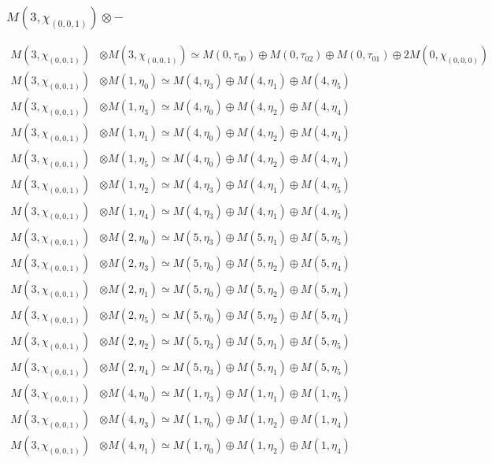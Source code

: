 \subsubsection{$ M(3,\chi_{(0,0,1)})\otimes -$}
\begin{align*}
M(3,\chi_{(0,0,1)}) &\otimes M(3,\chi_{(0,0,1)}) \simeq M(0,\tau_{00}) \oplus M(0,\tau_{02}) \oplus M(0,\tau_{01}) \oplus 2 M(0,\chi_{(0,0,0)})\\
M(3,\chi_{(0,0,1)}) &\otimes M(1,\eta_{0}) \simeq M(4,\eta_{3}) \oplus M(4,\eta_{1}) \oplus M(4,\eta_{5})\\
M(3,\chi_{(0,0,1)}) &\otimes M(1,\eta_{3}) \simeq M(4,\eta_{0}) \oplus M(4,\eta_{2}) \oplus M(4,\eta_{4})\\
M(3,\chi_{(0,0,1)}) &\otimes M(1,\eta_{1}) \simeq M(4,\eta_{0}) \oplus M(4,\eta_{2}) \oplus M(4,\eta_{4})\\
M(3,\chi_{(0,0,1)}) &\otimes M(1,\eta_{5}) \simeq M(4,\eta_{0}) \oplus M(4,\eta_{2}) \oplus M(4,\eta_{4})\\
M(3,\chi_{(0,0,1)}) &\otimes M(1,\eta_{2}) \simeq M(4,\eta_{3}) \oplus M(4,\eta_{1}) \oplus M(4,\eta_{5})\\
M(3,\chi_{(0,0,1)}) &\otimes M(1,\eta_{4}) \simeq M(4,\eta_{3}) \oplus M(4,\eta_{1}) \oplus M(4,\eta_{5})\\
M(3,\chi_{(0,0,1)}) &\otimes M(2,\eta_{0}) \simeq M(5,\eta_{3}) \oplus M(5,\eta_{1}) \oplus M(5,\eta_{5})\\
M(3,\chi_{(0,0,1)}) &\otimes M(2,\eta_{3}) \simeq M(5,\eta_{0}) \oplus M(5,\eta_{2}) \oplus M(5,\eta_{4})\\
M(3,\chi_{(0,0,1)}) &\otimes M(2,\eta_{1}) \simeq M(5,\eta_{0}) \oplus M(5,\eta_{2}) \oplus M(5,\eta_{4})\\
M(3,\chi_{(0,0,1)}) &\otimes M(2,\eta_{5}) \simeq M(5,\eta_{0}) \oplus M(5,\eta_{2}) \oplus M(5,\eta_{4})\\
M(3,\chi_{(0,0,1)}) &\otimes M(2,\eta_{2}) \simeq M(5,\eta_{3}) \oplus M(5,\eta_{1}) \oplus M(5,\eta_{5})\\
M(3,\chi_{(0,0,1)}) &\otimes M(2,\eta_{4}) \simeq M(5,\eta_{3}) \oplus M(5,\eta_{1}) \oplus M(5,\eta_{5})\\
M(3,\chi_{(0,0,1)}) &\otimes M(4,\eta_{0}) \simeq M(1,\eta_{3}) \oplus M(1,\eta_{1}) \oplus M(1,\eta_{5})\\
M(3,\chi_{(0,0,1)}) &\otimes M(4,\eta_{3}) \simeq M(1,\eta_{0}) \oplus M(1,\eta_{2}) \oplus M(1,\eta_{4})\\
M(3,\chi_{(0,0,1)}) &\otimes M(4,\eta_{1}) \simeq M(1,\eta_{0}) \oplus M(1,\eta_{2}) \oplus M(1,\eta_{4})\\

\end{align*}
